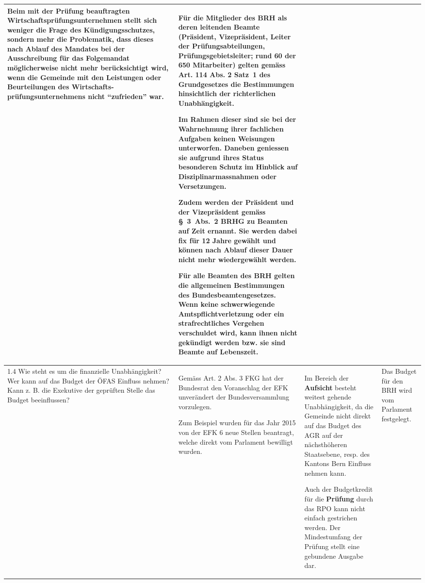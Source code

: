 \documentclass[10pt]{article}
\begin{document}
\begin{landscape}
\begin{center}
\begin{longtable}{|p{4cm}|p{5cm}|p{7.5cm}|p{7.5cm}|}
Beim mit der Prüfung beauftragten  Wirtschaftsprüfungsunternehmen stellt sich weniger die Frage des Kündigungsschutzes, sondern mehr die Problematik, dass dieses nach Ablauf des Mandates bei der Ausschreibung für das Folge­mandat möglicherweise nicht mehr berücksichtigt wird, wenn die Gemeinde mit den Leistungen oder Beurteilungen des Wirtschafts­prüfungsunternehmens nicht “{}zufrieden”{} war.

 & Für die Mitglieder des BRH als deren leitenden Beamte (Präsident, Vizepräsident, Leiter der Prüfungsabteilungen, Prüfungsgebietsleiter; rund 60 der 650 Mitarbeiter) gelten gemäss Art. 114 Abs. 2 Satz~1 des Grundgesetzes die Bestimmungen hinsichtlich der richterlichen Unabhängigkeit.

Im Rahmen dieser sind sie bei der Wahrnehmung ihrer fachlichen Aufgaben keinen Weisungen unterworfen. Daneben geniessen sie aufgrund ihres Status besonderen Schutz im Hinblick auf Disziplinarmassnahmen oder Versetzungen.

Zudem werden der Präsident und der Vizepräsident gemäss §~3~Abs.~2 BRHG zu Beamten auf Zeit ernannt. Sie werden dabei fix für 12 Jahre gewählt und können nach Ablauf dieser Dauer nicht mehr wieder­gewählt werden.

Für alle Beamten des BRH gelten die allgemeinen Bestimmungen des Bundesbeamtengesetzes. Wenn keine schwerwiegende Amtspflicht­verletzung oder ein strafrechtliches Vergehen verschuldet wird, kann ihnen nicht gekündigt werden bzw. sie sind Beamte auf Lebenszeit.

 \\
\hline
1.4 Wie steht es um die finanzielle Unabhängigkeit? Wer kann auf das Budget der ÖFAS Einfluss nehmen? Kann z. B. die Exekutive der geprüften Stelle das Budget beeinflussen? & Gemäss Art. 2 Abs. 3 FKG hat der Bundesrat den Voranschlag der EFK unverändert der Bundesversammlung vorzulegen.

Zum Beispiel wurden für das Jahr 2015 von der EFK 6 neue Stellen beantragt, welche direkt vom Parlament bewilligt wurden.

 & Im Bereich der \textbf{Aufsicht} besteht weitest gehende Unabhängigkeit, da die Gemeinde nicht direkt auf das Budget des AGR auf der nächsthöheren Staatsebene, resp. des Kantons Bern Einfluss nehmen kann.

Auch der Budgetkredit für die \textbf{Prüfung} durch das RPO kann nicht einfach gestrichen werden. Der Mindestumfang der Prüfung stellt eine gebundene Ausgabe dar.

 & Das Budget für den BRH wird vom Parlament festgelegt.


\end{longtable}
\end{center}
\end{landscape}
\end{document}
